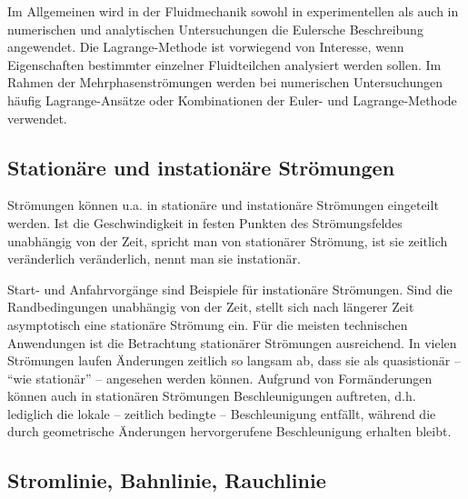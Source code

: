 \documentclass{lecture}
\begin{document}
    Im Allgemeinen wird in der Fluidmechanik sowohl in experimentellen als auch in numerischen und analytischen Untersuchungen die Eulersche Beschreibung angewendet.
    Die Lagrange-Methode ist vorwiegend von Interesse, wenn Eigenschaften bestimmter einzelner Fluidteilchen analysiert werden sollen.
    Im Rahmen der Mehrphasenströmungen werden bei numerischen Untersuchungen häufig Lagrange-Ansätze oder Kombinationen der Euler- und Lagrange-Methode verwendet.


    \subsection*{Stationäre und instationäre Strömungen}

    Strömungen können u.a. in stationäre und instationäre Strömungen eingeteilt werden.
    Ist die Geschwindigkeit in festen Punkten des Strömungsfeldes unabhängig von der Zeit, spricht man von stationärer Strömung, ist sie zeitlich veränderlich veränderlich, nennt man sie instationär.

    Start- und Anfahrvorgänge sind Beispiele für instationäre Strömungen.
    Sind die Randbedingungen unabhängig von der Zeit, stellt sich nach längerer Zeit asymptotisch eine stationäre Strömung ein.
    Für die meisten technischen Anwendungen ist die Betrachtung stationärer Strömungen ausreichend.
    In vielen Strömungen laufen Änderungen zeitlich so langsam ab, dass sie als quasistionär -- ``wie stationär'' -- angesehen werden können.
    Aufgrund von Formänderungen können auch in stationären Strömungen Beschleunigungen  auftreten, d.h. lediglich die lokale -- zeitlich bedingte -- Beschleunigung entfällt, während die durch geometrische Änderungen hervorgerufene Beschleunigung erhalten bleibt.


    \subsection*{Stromlinie, Bahnlinie, Rauchlinie}
\end{document}
